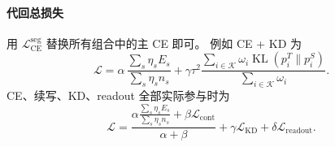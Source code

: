 \documentclass[UTF8,a4paper,11pt]{ctexart}
\newcommand{\CE}{\mathcal{L}_{\mathrm{CE}}}
\newcommand{\CT}{\mathcal{L}_{\mathrm{cont}}}
\newcommand{\KD}{\mathcal{L}_{\mathrm{KD}}}
\newcommand{\RO}{\mathcal{L}_{\mathrm{readout}}}
\newcommand{\KL}{\operatorname{KL}}
\begin{document}
\paragraph{代回总损失}
用 $\CE^{\mathrm{seg}}$ 替换所有组合中的主 CE 即可。
例如 CE + KD 为
\begin{equation}
\boxed{
\mathcal{L}=\alpha\,
\frac{\sum_s\eta_s E_s}{\sum_s\eta_s n_s}
+\gamma\tau^2
\frac{\sum_{i\in\mathcal{K}}\omega_i\KL(p_i^T\|p_i^S)}
{\sum_{i\in\mathcal{K}}\omega_i}.
}
\end{equation}
CE、续写、KD、readout 全部实际参与时为
\begin{equation}
\boxed{
\mathcal{L}=
\frac{\displaystyle\alpha
\frac{\sum_s\eta_s E_s}{\sum_s\eta_s n_s}+\beta\CT}
{\alpha+\beta}
+\gamma\KD+\delta\RO.
}
\end{equation}
\end{document}
